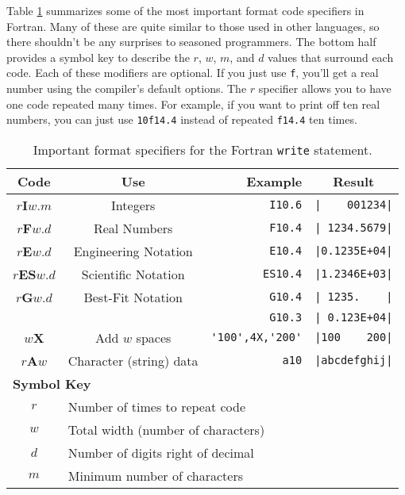 \documentclass[11pt, letterpaper]{article}
\begin{document}
Table \ref{tab:codes} summarizes some of the most important format code specifiers
in Fortran.  Many of these are quite similar to those used in other languages, so
there shouldn't be any surprises to seasoned programmers.  The bottom half
provides a symbol key to describe the $r$, $w$, $m$, and $d$ values that
surround each code.  Each of these modifiers are optional.  If you just use
{\tt f}, you'll get a real number using the compiler's default options.
The $r$ specifier allows you to have one code repeated many times.  For
example, if you want to print off ten real numbers, you can just use
{\tt 10f14.4} instead of repeated {\tt f14.4} ten times.

\begin{table}[!h]
  \begin{center}
  \begin{tabular}{|c|c|r|c|}
    \hline
    Code & Use & Example &  Result \\
    \hline
    $r$\textbf{I}$w.m$ & Integers             & \verb_I10.6_ & \verb_|    001234|_\\
    $r$\textbf{F}$w.d$ & Real Numbers         & \verb_F10.4_ & \verb_| 1234.5679|_\\
    $r$\textbf{E}$w.d$ & Engineering Notation & \verb_E10.4_ & \verb_|0.1235E+04|_\\
    $r$\textbf{ES}$w.d$& Scientific Notation  & \verb_ES10.4_& \verb_|1.2346E+03|_\\
    $r$\textbf{G}$w.d$ & Best-Fit Notation    & \verb_G10.4_ & \verb_| 1235.    |_\\
    &                                         & \verb_G10.3_ & \verb_| 0.123E+04|_\\
    $w$\textbf{X} & Add $w$ spaces & \verb_'100',4X,'200'_   & \verb_|100    200|_\\
    $r$\textbf{A}$w$ & Character (string) data& \verb_a10_   & \verb_|abcdefghij|_\\
    \hline
    \multicolumn{4}{|l|}{\textbf{Symbol Key}}\\
    \multicolumn{1}{|c}{$r$} & \multicolumn{3}{l|}{Number of times to repeat code}    \\
    \multicolumn{1}{|c}{$w$} & \multicolumn{3}{l|}{Total width (number of characters)}\\
    \multicolumn{1}{|c}{$d$} & \multicolumn{3}{l|}{Number of digits right of decimal} \\ 
    \multicolumn{1}{|c}{$m$} & \multicolumn{3}{l|}{Minimum number of characters}      \\
    \hline
    
  \end{tabular}
  \end{center}
  \caption{Important format specifiers for the Fortran {\tt write} statement.}
  \label{tab:codes}
\end{table}
\end{document}
